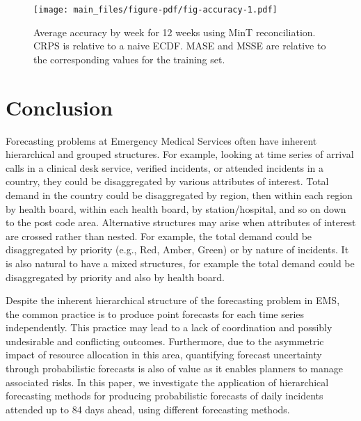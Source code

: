 \documentclass[
  authoryear,
  preprint,
  3p]{elsarticle}
\begin{document}
\begin{figure}[H]

{\centering \texttt{[image: main\_files/figure-pdf/fig-accuracy-1.pdf]}

}

\caption{\label{fig-accuracy}Average accuracy by week for 12 weeks using
MinT reconciliation. CRPS is relative to a naive ECDF. MASE and MSSE are
relative to the corresponding values for the training set.}

\end{figure}

\hypertarget{sec-conclusion}{%
\section{Conclusion}\label{sec-conclusion}}

Forecasting problems at Emergency Medical Services often have inherent
hierarchical and grouped structures. For example, looking at time series
of arrival calls in a clinical desk service, verified incidents, or
attended incidents in a country, they could be disaggregated by various
attributes of interest. Total demand in the country could be
disaggregated by region, then within each region by health board, within
each health board, by station/hospital, and so on down to the post code
area. Alternative structures may arise when attributes of interest are
crossed rather than nested. For example, the total demand could be
disaggregated by priority (e.g., Red, Amber, Green) or by nature of
incidents. It is also natural to have a mixed structures, for example
the total demand could be disaggregated by priority and also by health
board.

Despite the inherent hierarchical structure of the forecasting problem
in EMS, the common practice is to produce point forecasts for each time
series independently. This practice may lead to a lack of coordination
and possibly undesirable and conflicting outcomes. Furthermore, due to
the asymmetric impact of resource allocation in this area, quantifying
forecast uncertainty through probabilistic forecasts is also of value as
it enables planners to manage associated risks. In this paper, we
investigate the application of hierarchical forecasting methods for
producing probabilistic forecasts of daily incidents attended up to 84
days ahead, using different forecasting methods.
\end{document}

